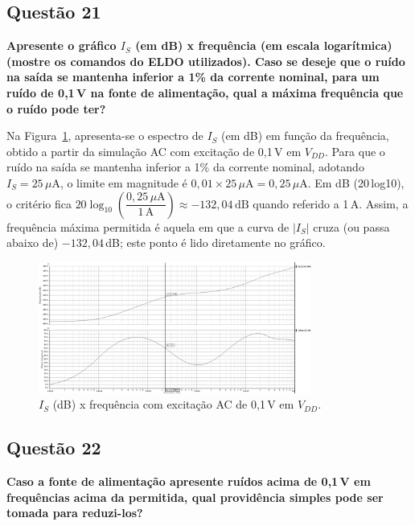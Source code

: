 \documentclass[12pt,a4paper]{article}
\begin{document}
\subsection*{Questão 21}
\begin{BoxQ}
	\textbf{Apresente o gráfico $I_{S}$ (em dB) x frequência (em escala logarítmica) (mostre os comandos do ELDO utilizados). Caso se deseje que o ruído na saída se mantenha inferior a 1\% da corrente nominal, para um ruído de 0,1\,V na fonte de alimentação, qual a máxima frequência que o ruído pode ter?}
\end{BoxQ}

Na Figura~\ref{fig:q21_is_db}, apresenta-se o espectro de $I_S$ (em dB) em função da frequência, obtido a partir da simulação AC com excitação de 0,1\,V em $V_{DD}$. Para que o ruído na saída se mantenha inferior a 1\% da corrente nominal, adotando $I_S=25\,\mu$A, o limite em magnitude é $0{,}01\times 25\,\mu\text{A}=0{,}25\,\mu\text{A}$. Em dB (20\,log10), o critério fica $20\log_{10}\!\left(\dfrac{0{,}25\,\mu\text{A}}{1\,\text{A}}\right)\approx -132{,}04\,\text{dB}$ quando referido a 1\,A. Assim, a frequência máxima permitida é aquela em que a curva de $|I_S|$ cruza (ou passa abaixo de) $-132{,}04$\,dB; este ponto é lido diretamente no gráfico.

\begin{figure}[H]
    \centering
    \includegraphics[width=0.8\textwidth]{images/21.png}
    \caption{$I_S$ (dB) x frequência com excitação AC de 0,1\,V em $V_{DD}$. }
    \label{fig:q21_is_db}
\end{figure}

\subsection*{Questão 22}
\begin{BoxQ}
	\textbf{Caso a fonte de alimentação apresente ruídos acima de 0,1\,V em frequências acima da permitida, qual providência simples pode ser tomada para reduzi-los?}
\end{BoxQ}
\end{document}
